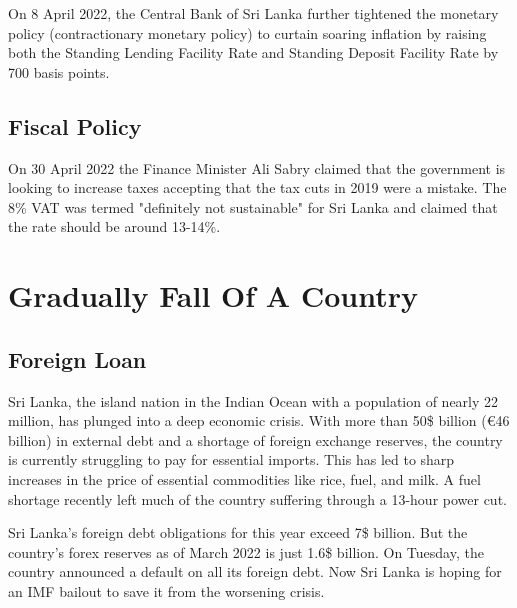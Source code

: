 \documentclass[a4paper,12pt]{article}
\begin{document}
On 8 April 2022, the Central Bank of Sri Lanka further tightened the monetary policy (contractionary monetary policy) to curtain soaring inflation by raising both the Standing Lending Facility Rate and Standing Deposit Facility Rate by 700 basis points.
\subsection{Fiscal Policy}
On 30 April 2022 the Finance Minister Ali Sabry claimed that the government is looking to increase taxes accepting that the tax cuts in 2019 were a mistake. The 8\% VAT was termed "definitely not sustainable" for Sri Lanka and claimed that the rate should be around 13-14\%.
\section{Gradually Fall Of A Country}

\subsection{Foreign Loan}
Sri Lanka, the island nation in the Indian Ocean with a population of nearly 22 million, has plunged into a deep economic crisis. With more than 50\$ billion (€46 billion) in external debt and a shortage of foreign exchange reserves, the country is currently struggling to pay for essential imports. This has led to sharp increases in the price of essential commodities like rice, fuel, and milk. A fuel shortage recently left much of the country suffering through a 13-hour power cut.

Sri Lanka's foreign debt obligations for this year exceed 7\$ billion. But the country's forex reserves as of March 2022 is just 1.6\$ billion. On Tuesday, the country announced a default on all its foreign debt. Now Sri Lanka is hoping for an IMF bailout to save it from the worsening crisis. 
\end{document}
